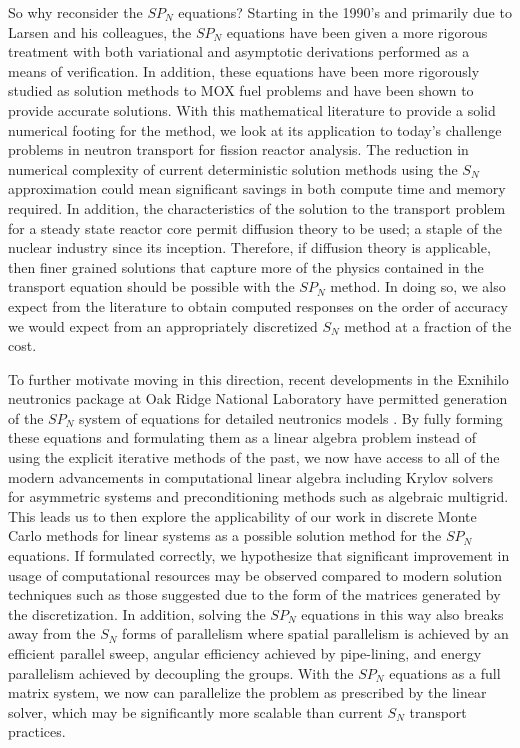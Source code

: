 So why reconsider the $SP_N$ equations? Starting in the 1990's and
primarily due to Larsen and his colleagues, the $SP_N$ equations have
been given a more rigorous treatment with both variational and
asymptotic derivations performed as a means of verification. In
addition, these equations have been more rigorously studied as
solution methods to MOX fuel problems and have been shown to provide
accurate solutions. With this mathematical literature to provide a
solid numerical footing for the method, we look at its application to
today's challenge problems in neutron transport for fission reactor
analysis. The reduction in numerical complexity of current
deterministic solution methods using the $S_N$ approximation could
mean significant savings in both compute time and memory required. In
addition, the characteristics of the solution to the transport problem
for a steady state reactor core permit diffusion theory to be used; a
staple of the nuclear industry since its inception. Therefore, if
diffusion theory is applicable, then finer grained solutions that
capture more of the physics contained in the transport equation should
be possible with the $SP_N$ method. In doing so, we also expect from
the literature to obtain computed responses on the order of accuracy
we would expect from an appropriately discretized $S_N$ method at a
fraction of the cost.

To further motivate moving in this direction, recent developments in
the Exnihilo neutronics package at Oak Ridge National Laboratory have
permitted generation of the $SP_N$ system of equations for detailed
neutronics models \citep{evans_simpli_2013}. By fully forming these
equations and formulating them as a linear algebra problem instead of
using the explicit iterative methods of the past, we now have access
to all of the modern advancements in computational linear algebra
including Krylov solvers for asymmetric systems and preconditioning
methods such as algebraic multigrid. This leads us to then explore the
applicability of our work in discrete Monte Carlo methods for linear
systems as a possible solution method for the $SP_N$ equations. If
formulated correctly, we hypothesize that significant improvement in
usage of computational resources may be observed compared to modern
solution techniques such as those suggested due to the form of the
matrices generated by the discretization. In addition, solving the
$SP_N$ equations in this way also breaks away from the $S_N$ forms of
parallelism where spatial parallelism is achieved by an efficient
parallel sweep, angular efficiency achieved by pipe-lining, and energy
parallelism achieved by decoupling the groups. With the $SP_N$
equations as a full matrix system, we now can parallelize the problem
as prescribed by the linear solver, which may be significantly more
scalable than current $S_N$ transport practices.

